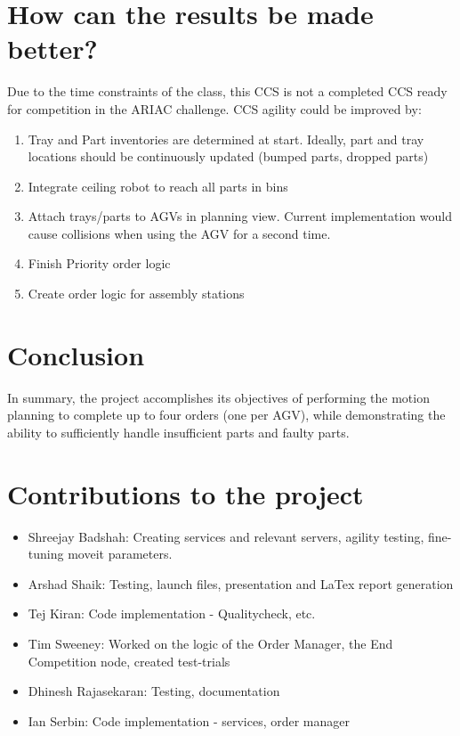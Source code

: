 \documentclass{uva-inf-article}
\begin{document}
\section{How can the results be made better?}
Due to the time constraints of the class, this CCS is not a completed CCS ready for competition in the ARIAC challenge.  CCS agility could be improved by:
\begin{enumerate}
    \item Tray and Part inventories are determined at start.  Ideally, part and tray locations should be continuously updated (bumped parts, dropped parts)
    \item Integrate ceiling robot to reach all parts in bins
    \item Attach trays/parts to AGVs in planning view.  Current implementation would cause collisions when using the AGV for a second time.
    \item Finish Priority order logic
    \item Create order logic for assembly stations
\end{enumerate}

\justifying
\section{Conclusion}
In summary, the project accomplishes its objectives of performing the motion planning to complete up to four orders (one per AGV), while demonstrating the ability to sufficiently handle insufficient parts and faulty parts.\\

\section{Contributions to the project}
\begin{itemize}
    \item Shreejay Badshah: Creating services and relevant servers, agility testing, fine-tuning moveit parameters.
    \item Arshad Shaik: Testing, launch files, presentation and LaTex report generation
    \item Tej Kiran: Code implementation - Qualitycheck, etc.
    \item Tim Sweeney: Worked on the logic of the Order Manager, the End Competition node, created test-trials
    \item Dhinesh Rajasekaran: Testing, documentation
    \item Ian Serbin: Code implementation - services, order manager
\end{itemize}
\end{document}
